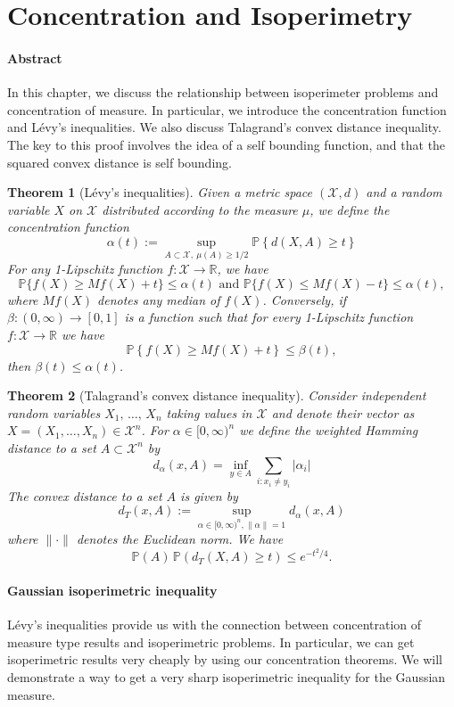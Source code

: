 \documentclass[reqno]{amsproc}
\newtheorem{theorem}{Theorem}
\newcommand{\R}{\mathbb{R}}
\renewcommand{\P}{\mathbb{P}} %
\newcommand{\X}{\mathcal{X}}
\begin{document}

\section{Concentration and Isoperimetry}
\label{sec:iso}
\paragraph{\textbf{Abstract}}
	In this chapter, we discuss the relationship between isoperimeter problems and concentration of measure.
	In particular, we introduce the concentration function and L\'evy's inequalities.
	We also discuss Talagrand's convex distance inequality.
	The key to this proof involves the idea of a self bounding function, and that the squared convex distance is self bounding.

\begin{theorem}[L\'evy's inequalities]
\label{thm:levy}
	Given a metric space $(\X, d)$ and a random variable $X$ on $\X$ distributed according to the measure $\mu$, we define the concentration function
	\[\alpha(t) := \sup_{A \subset \X, \ \mu(A) \geq 1/2} \P \left\{ d(X,A) \geq t \right \} \]
	For any 1-Lipschitz function $f: \X \to \R$, we have
	\[\P \{f(X) \geq Mf(X) + t \} \leq \alpha(t) \textrm{ and } \P \{f(X) \leq Mf(X) - t \} \leq \alpha(t), \]
	where $Mf(X)$ denotes any median of $f(X)$. Conversely, if $\beta : (0,\infty) \to [0,1]$ is a function such that for every 1-Lipschitz function $f : \X \to \R$ we have 
	\[ \P \left\{f(X) \geq Mf(X) + t \right\} \leq \beta(t),\]
	then $\beta(t) \leq \alpha(t)$.
\end{theorem}

\begin{theorem}[Talagrand's convex distance inequality]
\label{thm:tal}
	Consider independent random variables $X_1,\, \dots,\, X_n$ taking values in $\X$ and denote their vector as $X = (X_1, \dots, X_n) \in \X^n$.
	For $\alpha \in [0, \infty)^n$ we define the weighted Hamming distance to a set $A \subset \X^n$ by
	\[d_{\alpha}(x, A) = \inf_{y \in A} \sum_{i: x_i \not = y_i} |\alpha_i| \]
	The convex distance to a set $A$ is given by
	\[d_T(x, A) := \sup_{ \alpha \in [0, \infty)^n, \|\alpha\| = 1} d_{\alpha}(x,A)\]
	where $\|\cdot\|$ denotes the Euclidean norm.
	We have
	\[\P(A)\,\P(d_T(X,A) \geq t) \leq e^{-t^2/4}.\]
\end{theorem}

\paragraph{ \bf Gaussian isoperimetric inequality} \label{rmk:iso}
	L\'evy's inequalities provide us with the connection between concentration of measure type results and isoperimetric problems.
	In particular, we can get isoperimetric results very cheaply by using our concentration theorems.
	We will demonstrate a way to get a very sharp isoperimetric inequality for the Gaussian measure.
\end{document}
